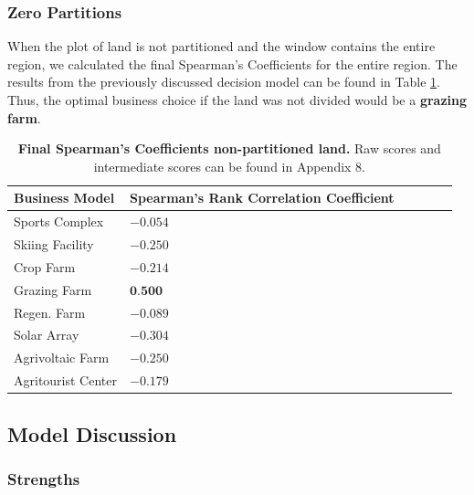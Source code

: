 \documentclass{mcmthesis}
\begin{document}
\subsubsection{Zero Partitions}
When the plot of land is not partitioned and the window contains the entire region, we calculated the final Spearman's Coefficients for the entire region. The results from the previously discussed decision model can be found in Table \ref{tab:spearman0}. Thus, the optimal business choice if the land was not divided would be a \textbf{grazing farm}.

\begin{table}[!htbp]
    \begin{tabularx}{\textwidth}{XlXlXl}
        \toprule
        \textbf{Business Model} & \textbf{Spearman's Rank Correlation Coefficient} \\
        \midrule
        Sports Complex & $-0.054$ \\
        Skiing Facility & $-0.250$  \\
        Crop Farm & $-0.214$   \\
        Grazing Farm & $\textbf{0.500}$\\
        Regen. Farm & $-0.089$  \\
        Solar Array & $-0.304$  \\
        Agrivoltaic Farm & $-0.250$ \\
        Agritourist Center & $-0.179$ \\
        \bottomrule
    \end{tabularx}
    \caption{\textbf{Final Spearman's Coefficients non-partitioned land.} Raw scores and intermediate scores can be found in Appendix 8.}
    \label{tab:spearman0}
\end{table}


\subsection{Model Discussion}
\subsubsection{Strengths}
\end{document}
